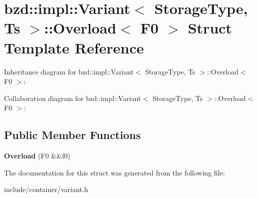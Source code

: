 \hypertarget{structbzd_1_1impl_1_1Variant_1_1Overload_3_01F0_01_4}{}\section{bzd\+:\+:impl\+:\+:Variant$<$ Storage\+Type, Ts $>$\+:\+:Overload$<$ F0 $>$ Struct Template Reference}
\label{structbzd_1_1impl_1_1Variant_1_1Overload_3_01F0_01_4}


Inheritance diagram for bzd\+:\+:impl\+:\+:Variant$<$ Storage\+Type, Ts $>$\+:\+:Overload$<$ F0 $>$\+:


Collaboration diagram for bzd\+:\+:impl\+:\+:Variant$<$ Storage\+Type, Ts $>$\+:\+:Overload$<$ F0 $>$\+:
\subsection*{Public Member Functions}
\begin{DoxyCompactItemize}
\item 
\mbox{\label{structbzd_1_1impl_1_1Variant_1_1Overload_3_01F0_01_4_a7d7ecf40bb86cf99f9120ebc4146b1bf}} 
{\bfseries Overload} (F0 \&\&f0)
\end{DoxyCompactItemize}


The documentation for this struct was generated from the following file\+:\begin{DoxyCompactItemize}
\item 
include/container/variant.\+h\end{DoxyCompactItemize}
